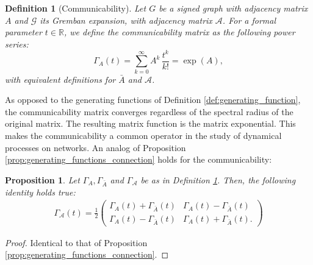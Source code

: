 \documentclass[reprint,onecolumn]{article}
\newtheorem{definition}[theorem]{Definition}  %
\newtheorem{proposition}[theorem]{Proposition}
\newcommand{\mc}[1]{\mathcal{#1}}
\newcommand{\R}{\mathbb{R}}
\newcommand{\1}{\mathbb{1}}
\newcommand{\0}{\mathbf{0}}
\begin{document}
\begin{definition}[Communicability]  \label{def:communicability}
    Let $G$ be a signed graph with adjacency matrix \(A\) and $\mc G$ its Gremban expansion, with adjacency matrix $\mc A$. For a formal parameter \(t\in \R\), we define the \emph{communicability matrix} as the following power series:
\[
\Gamma_A(t)=\sum_{k=0}^\infty A^k\,\frac{t^k}{k!}=\exp(A),\]
with equivalent definitions for $\bar A$ and $\mc A$.
\end{definition}
As opposed to the generating functions of Definition \ref{def:generating_function}, the communicability matrix converges regardless of the spectral radius of the original matrix. The resulting matrix function is the matrix exponential. This makes the communicability a common operator in the study of dynamical processes on networks. An analog of Proposition \ref{prop:generating_functions_connection} holds for the communicability:

\begin{proposition}
Let $\Gamma_A, \Gamma_{\bar A}$ and $\Gamma_\mc A$ 
be as in Definition \ref{def:communicability}. Then, the following identity holds true:
\begin{align*}
    \Gamma_\mc A(t) = \frac1{2} \begin{pmatrix}
        \Gamma_A(t)+\Gamma_{\bar A}(t) &  \Gamma_A(t)-\Gamma_{\bar A}(t) \\
       \Gamma_A(t)-\Gamma_{\bar A}(t) &  \Gamma_A(t)+\Gamma_{\bar A}(t).
    \end{pmatrix}
\end{align*}
\end{proposition}

\begin{proof}
    Identical to that of Proposition \ref{prop:generating_functions_connection}.
\end{proof}
\end{document}
